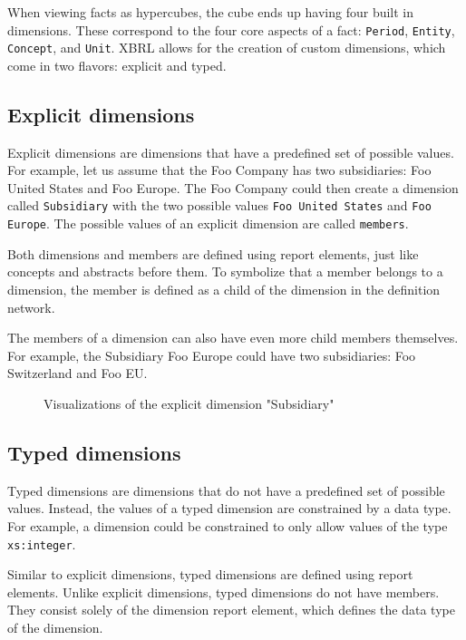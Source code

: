 When viewing facts as hypercubes, the cube ends up having four built in dimensions.
These correspond to the four core aspects of a fact: \texttt{Period}, \texttt{Entity}, \texttt{Concept}, and \texttt{Unit}.
XBRL allows for the creation of custom dimensions, which come in two flavors: explicit and typed.

\subsection{Explicit dimensions}

Explicit dimensions are dimensions that have a predefined set of possible values.
For example, let us assume that the Foo Company has two subsidiaries: Foo United States and Foo Europe.
The Foo Company could then create a dimension called \texttt{Subsidiary} with the two possible values \texttt{Foo United States} and \texttt{Foo Europe}.
The possible values of an explicit dimension are called \texttt{members}.

Both dimensions and members are defined using report elements, just like concepts and abstracts before them.
To symbolize that a member belongs to a dimension, the member is defined as a child of the dimension in the definition network.

The members of a dimension can also have even more child members themselves.
For example, the Subsidiary Foo Europe could have two subsidiaries: Foo Switzerland and Foo EU.

\begin{figure}[H]
    \label{fig:example_explicit_dimension}
    \caption{Visualizations of the explicit dimension "Subsidiary"}
\end{figure}

\subsection{Typed dimensions}

Typed dimensions are dimensions that do not have a predefined set of possible values.
Instead, the values of a typed dimension are constrained by a data type.
For example, a dimension could be constrained to only allow values of the type \texttt{xs:integer}.

Similar to explicit dimensions, typed dimensions are defined using report elements.
Unlike explicit dimensions, typed dimensions do not have members.
They consist solely of the dimension report element, which defines the data type of the dimension.

